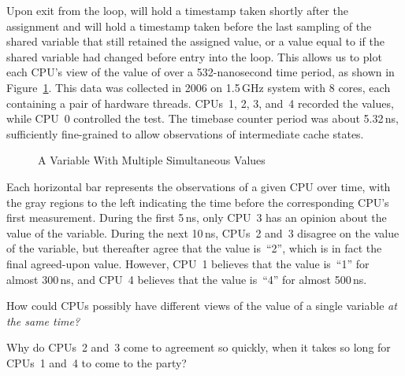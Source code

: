 Upon exit from the loop,  will hold a timestamp
taken shortly after the assignment and  will hold
a timestamp taken before the last sampling of the shared variable
that still retained the assigned value, or a value equal to 
if the shared variable had changed before entry into the loop.
This allows us to plot each CPU's view of the value of 
over a 532-nanosecond time period, as shown in
Figure~\ref{fig:memorder:A Variable With Multiple Simultaneous Values}.
This data was collected in 2006 on 1.5\,GHz  system with 8 cores,
each containing a pair of hardware threads.
CPUs~1, 2, 3, and~4 recorded the values, while CPU~0 controlled the test.
The timebase counter period was about 5.32\,ns, sufficiently fine-grained
to allow observations of intermediate cache states.

\begin{figure}[htb]
\centering
{}
\caption{A Variable With Multiple Simultaneous Values}
\label{fig:memorder:A Variable With Multiple Simultaneous Values}
\end{figure}

Each horizontal bar represents the observations of a given CPU over time,
with the gray regions to the left indicating the time before the
corresponding CPU's first measurement.
During the first 5\,ns, only CPU~3 has an opinion about the value of the
variable.
During the next 10\,ns, CPUs~2 and~3 disagree on the value of the variable,
but thereafter agree that the value is~``2'', which is in fact
the final agreed-upon value.
However, CPU~1 believes that the value is~``1'' for almost 300\,ns, and
CPU~4 believes that the value is~``4'' for almost 500\,ns.

\QuickQuiz{}
	How could CPUs possibly have different views of the
	value of a single variable \emph{at the same time?}
 \QuickQuizEnd

\QuickQuiz{}
	Why do CPUs~2 and~3 come to agreement so quickly, when it
	takes so long for CPUs~1 and~4 to come to the party?
 \QuickQuizEnd

